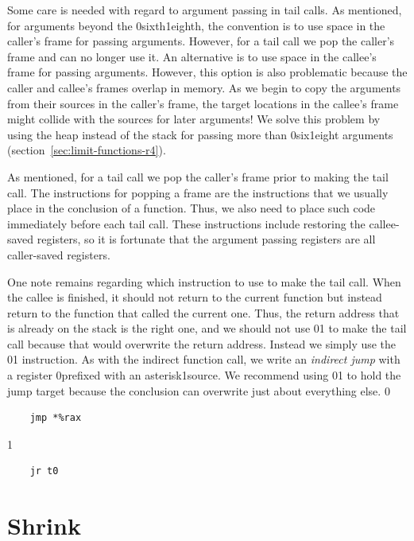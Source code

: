 \documentclass[7x10]{TimesAPriori_MIT}%
\def\xeightysixEd{0}
\def\riscvEd{1}
\def\architecture{1}
\newcommand\ifriscv[1]{\if\architecture\riscvEd{#1}\fi}
\newcommand\ifxeightsix[1]{\if\architecture\xeightysixEd{#1}\fi}
\numberwithin{theorem}{chapter}
\numberwithin{definition}{chapter}
\numberwithin{equation}{chapter}
\begin{document}
Some care is needed with regard to argument passing in tail calls.  As
mentioned, for arguments beyond the \ifxeightsix{sixth}\ifriscv{eighth}, the convention is to use
space in the caller's frame for passing arguments.  However, for a
tail call we pop the caller's frame and can no longer use it.  An
alternative is to use space in the callee's frame for passing
arguments. However, this option is also problematic because the caller
and callee's frames overlap in memory.  As we begin to copy the
arguments from their sources in the caller's frame, the target
locations in the callee's frame might collide with the sources for
later arguments! We solve this problem by using the heap instead of
the stack for passing more than \ifxeightsix{six}\ifriscv{eight} arguments
(section~\ref{sec:limit-functions-r4}).

As mentioned, for a tail call we pop the caller's frame prior to
making the tail call. The instructions for popping a frame are the
instructions that we usually place in the conclusion of a
function. Thus, we also need to place such code immediately before
each tail call. These instructions include restoring the callee-saved
registers, so it is fortunate that the argument passing registers are
all caller-saved registers.

One note remains regarding which instruction to use to make the tail
call. When the callee is finished, it should not return to the current
function but instead return to the function that called the current
one. Thus, the return address that is already on the stack is the
right one, and we should not use \ifxeightsix{}\ifriscv{} to make the tail call
because that would overwrite the return address. Instead we simply use
the \ifxeightsix{}\ifriscv{} instruction. As with the indirect function call, we write
an \emph{indirect jump} with a register
\ifxeightsix{prefixed with an asterisk}\ifriscv{source}.  We recommend using \ifxeightsix{\RAX}\ifriscv{} to hold the
jump target because the conclusion can overwrite just about everything
else.
\if\architecture\xeightysixEd
\begin{lstlisting}
    jmp *%rax
\end{lstlisting}
\fi
\if\architecture\riscvEd
\begin{lstlisting}
    jr t0
\end{lstlisting}
\fi

\section{Shrink \LangFun{}}
\label{sec:shrink-r4}
\end{document}
